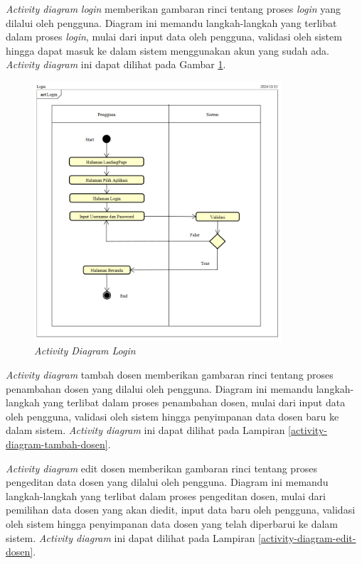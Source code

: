 \textit{Activity diagram} \textit{login} memberikan gambaran rinci tentang proses \textit{login} yang dilalui oleh pengguna. Diagram ini memandu langkah-langkah yang terlibat dalam proses \textit{login}, mulai dari input data oleh pengguna, validasi oleh sistem hingga dapat masuk ke dalam sistem menggunakan akun yang sudah ada. \textit{Activity diagram} ini dapat dilihat pada Gambar \ref{activity-diagram-login}.

\begin{figure}
	\centering
	\includegraphics[width=0.82\textwidth]{konten/gambar/activity-diagram/login.png}
	\caption{\textit{Activity Diagram Login}}
	\label{activity-diagram-login}
\end{figure}

\textit{Activity diagram} tambah dosen memberikan gambaran rinci tentang proses penambahan dosen yang dilalui oleh pengguna. Diagram ini memandu langkah-langkah yang terlibat dalam proses penambahan dosen, mulai dari input data oleh pengguna, validasi oleh sistem hingga penyimpanan data dosen baru ke dalam sistem. \textit{Activity diagram} ini dapat dilihat pada Lampiran \ref{activity-diagram-tambah-dosen}.

\textit{Activity diagram} edit dosen memberikan gambaran rinci tentang proses pengeditan data dosen yang dilalui oleh pengguna. Diagram ini memandu langkah-langkah yang terlibat dalam proses pengeditan dosen, mulai dari pemilihan data dosen yang akan diedit, input data baru oleh pengguna, validasi oleh sistem hingga penyimpanan data dosen yang telah diperbarui ke dalam sistem. \textit{Activity diagram} ini dapat dilihat pada Lampiran \ref{activity-diagram-edit-dosen}.

